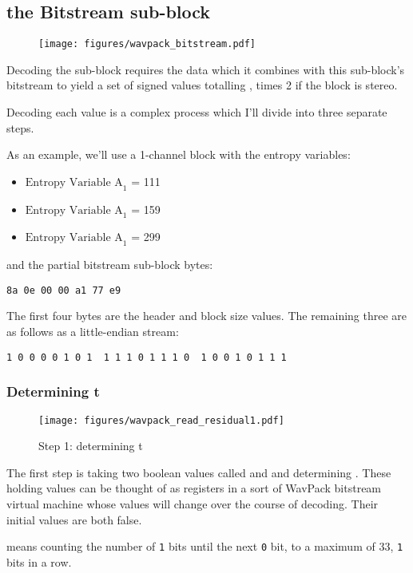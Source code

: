 \clearpage
\subsection{the Bitstream sub-block}
\begin{figure}[h]
\texttt{[image: figures/wavpack\_bitstream.pdf]}
\end{figure}
\par
\noindent

Decoding the  sub-block requires the 
data which it combines with this sub-block's bitstream to yield a set of signed
values totalling , times 2 if the block is stereo.

Decoding each value is a complex process which I'll divide into
three separate steps.

As an example, we'll use a 1-channel block with the entropy variables:
\begin{itemize}
\item $\text{Entropy Variable A}_1$ = 111
\item $\text{Entropy Variable A}_1$ = 159
\item $\text{Entropy Variable A}_1$ = 299
\end{itemize}
and the partial bitstream sub-block bytes:
\begin{Verbatim}[frame=single]
8a 0e 00 00 a1 77 e9
\end{Verbatim}
The first four bytes are the header and block size values.
The remaining three are as follows as a little-endian stream:
\begin{Verbatim}[frame=single]
1 0 0 0 0 1 0 1  1 1 1 0 1 1 1 0  1 0 0 1 0 1 1 1
\end{Verbatim}

\clearpage
\subsubsection{Determining t}
\begin{wrapfigure}[37]{r}{3in}
\texttt{[image: figures/wavpack\_read\_residual1.pdf]}
\caption{Step 1: determining t}
\end{wrapfigure}
The first step is taking two boolean values called
 and  and determining .
These holding values can be thought of as registers in a sort of
WavPack bitstream virtual machine whose values will
change over the course of decoding.
Their initial values are both false.

 means counting the number
of \texttt{1} bits until the next \texttt{0} bit, to a maximum
of 33, \texttt{1} bits in a row.

